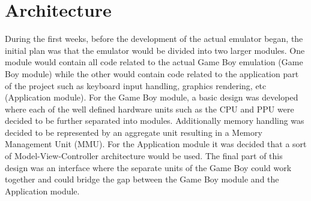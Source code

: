 \section{Architecture}
During the first weeks, before the development of the actual emulator began, the initial plan was that the emulator would be divided into two larger modules. One module would contain all code related to the actual Game Boy emulation (Game Boy module) while the other would contain code related to the application part of the project such as keyboard input handling, graphics rendering, etc (Application module). For the Game Boy module, a basic design was developed where each of the well defined hardware units such as the CPU and PPU were decided to be further separated into modules. Additionally memory handling was decided to be represented by an aggregate unit resulting in a Memory Management Unit (MMU). For the Application module it was decided that a sort of Model-View-Controller architecture would be used. The final part of this design was an interface where the separate units of the Game Boy could work together and could bridge the gap between the Game Boy module and the Application module.

